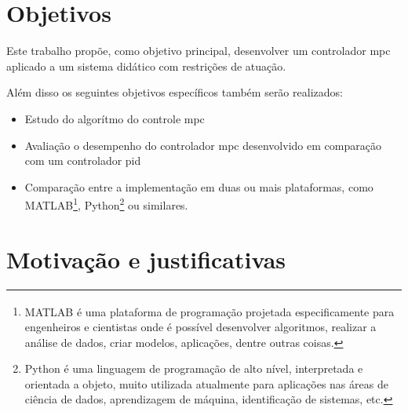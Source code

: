 \section{Objetivos}
\label{sec:objetivos}

Este trabalho propõe, como objetivo principal, desenvolver um controlador \acrshort{mpc}
aplicado a um sistema didático com restrições de atuação.

Além disso os seguintes objetivos específicos também serão realizados:
\begin{itemize}
    \item Estudo do algorítmo do controle \acrshort{mpc}
    \item Avaliação o desempenho do controlador \acrshort{mpc} desenvolvido em
        comparação com um controlador \acrshort{pid}
    \item Comparação entre a implementação em duas ou mais plataformas,
        como MATLAB\textsuperscript{\tiny\textregistered}\footnote{
            MATLAB\textsuperscript{\tiny\textregistered} é uma plataforma                           %
            de programação projetada especificamente para engenheiros e cientistas                  %
            onde é possível desenvolver algoritmos, realizar a análise de dados,                    %
            criar modelos, aplicações, dentre outras coisas.},                                      %
        Python\footnote{
            Python é uma linguagem de programação de alto nível,                                    %
            interpretada e orientada a objeto, muito utilizada atualmente para                      %
            aplicações nas áreas de ciência de dados, aprendizagem de máquina,                      %
            identificação de sistemas, etc.}                                                        %
        ou similares.
\end{itemize}

\section{Motivação e justificativas}
\label{sec:motivacao_e_justificativas}


